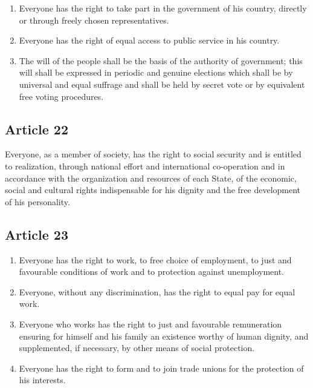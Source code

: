 \documentclass[
  titlepage,
  openright,
  DIV=calc,
  toc=listof,
  listof=nochaptergap]{scrbook}
\begin{document}
\begin{enumerate}
\def\labelenumi{\arabic{enumi}.}
\item
  Everyone has the right to take part in the government of his country,
  directly or through freely chosen representatives.
\item
  Everyone has the right of equal access to public service in his
  country.
\item
  The will of the people shall be the basis of the authority of
  government; this will shall be expressed in periodic and genuine
  elections which shall be by universal and equal suffrage and shall be
  held by secret vote or by equivalent free voting procedures.
\end{enumerate}

\hypertarget{article-22}{%
\subsection{Article 22}\label{article-22}}

Everyone, as a member of society, has the right to social security and
is entitled to realization, through national effort and international
co-operation and in accordance with the organization and resources of
each State, of the economic, social and cultural rights indispensable
for his dignity and the free development of his personality.

\hypertarget{article-23}{%
\subsection{Article 23}\label{article-23}}

\begin{enumerate}
\def\labelenumi{\arabic{enumi}.}
\item
  Everyone has the right to work, to free choice of employment, to just
  and favourable conditions of work and to protection against
  unemployment.
\item
  Everyone, without any discrimination, has the right to equal pay for
  equal work.
\item
  Everyone who works has the right to just and favourable remuneration
  ensuring for himself and his family an existence worthy of human
  dignity, and supplemented, if necessary, by other means of social
  protection.
\item
  Everyone has the right to form and to join trade unions for the
  protection of his interests.
\end{enumerate}
\end{document}
